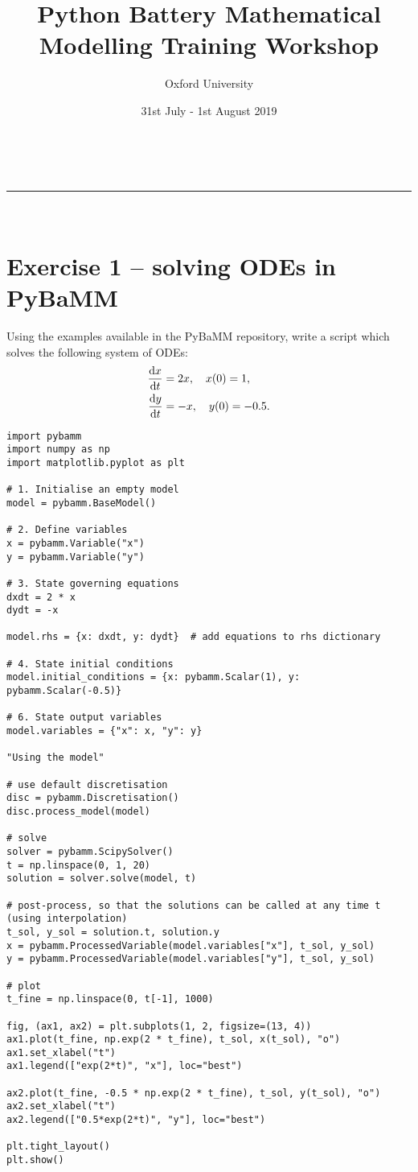 \documentclass[a4paper,11pt]{article}
\makeatletter
\newcommand{\linia}{\rule{\linewidth}{0.5pt}}
\theoremstyle{mytheor}
\renewcommand{\maketitle}{
\begin{center}
\vspace{2ex}
{\huge \textsc{\@title}}
\vspace{1ex}
\\
\linia\\
\@author \hfill \@date
\vspace{4ex}
\end{center}
}
\makeatother
\begin{document}
\title{\textbf{P}ython \textbf{Ba}ttery \textbf{M}athematical \textbf{M}odelling Training Workshop}

\author{Oxford University}

\date{31st July - 1st August 2019}

\maketitle

\section*{Exercise 1 -- solving ODEs in PyBaMM}

Using the examples available in the PyBaMM repository, write a script which solves the following system of ODEs:
\begin{align*}
  \dv{x}{t} &= 2x, \quad x(0) = 1, \\
  \dv{y}{t} &= -x, \quad y(0) = -0.5.
\end{align*}


\begin{lstlisting}[label={Ex1},caption=Solving ODEs in PyBaMM.]
import pybamm
import numpy as np
import matplotlib.pyplot as plt

# 1. Initialise an empty model
model = pybamm.BaseModel()

# 2. Define variables
x = pybamm.Variable("x")
y = pybamm.Variable("y")

# 3. State governing equations
dxdt = 2 * x
dydt = -x

model.rhs = {x: dxdt, y: dydt}  # add equations to rhs dictionary

# 4. State initial conditions
model.initial_conditions = {x: pybamm.Scalar(1), y: pybamm.Scalar(-0.5)}

# 6. State output variables
model.variables = {"x": x, "y": y}

"Using the model"

# use default discretisation
disc = pybamm.Discretisation()
disc.process_model(model)

# solve
solver = pybamm.ScipySolver()
t = np.linspace(0, 1, 20)
solution = solver.solve(model, t)

# post-process, so that the solutions can be called at any time t (using interpolation)
t_sol, y_sol = solution.t, solution.y
x = pybamm.ProcessedVariable(model.variables["x"], t_sol, y_sol)
y = pybamm.ProcessedVariable(model.variables["y"], t_sol, y_sol)

# plot
t_fine = np.linspace(0, t[-1], 1000)

fig, (ax1, ax2) = plt.subplots(1, 2, figsize=(13, 4))
ax1.plot(t_fine, np.exp(2 * t_fine), t_sol, x(t_sol), "o")
ax1.set_xlabel("t")
ax1.legend(["exp(2*t)", "x"], loc="best")

ax2.plot(t_fine, -0.5 * np.exp(2 * t_fine), t_sol, y(t_sol), "o")
ax2.set_xlabel("t")
ax2.legend(["0.5*exp(2*t)", "y"], loc="best")

plt.tight_layout()
plt.show()
\end{lstlisting}
\end{document}
